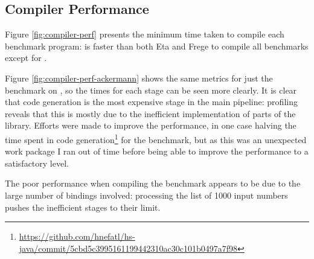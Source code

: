 \documentclass[dissertation.tex]{subfiles}
\begin{document}
{    \subsection{Compiler Performance}
    {
        Figure \ref{fig:compiler-perf} presents the minimum time taken to compile each benchmark program: \compilername is faster than both Eta and Frege to compile all benchmarks except for . 

        Figure \ref{fig:compiler-perf-ackermann} shows the same metrics for just the  benchmark on \compilername, so the times for each stage can be seen more clearly. It is clear that code generation is the most expensive stage in the main pipeline: profiling reveals that this is mostly due to the inefficient implementation of parts of the  library. Efforts were made to improve the performance, in one case halving the time spent in code generation\footnote{\url{https://github.com/hnefatl/hs-java/commit/5cbd5c3995161199442310ac30c101b0497a7f98}} for the  benchmark, but as this was an unexpected work package I ran out of time before being able to improve the performance to a satisfactory level.
        
        The poor performance when compiling the  benchmark appears to be due to the large number of bindings involved: processing the list of 1000 input numbers pushes the inefficient stages to their limit. 

}}
\end{document}
